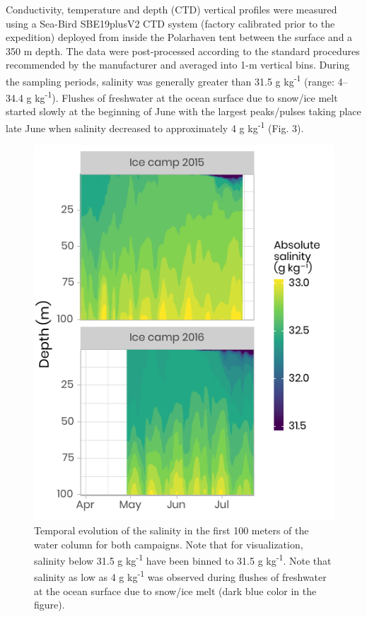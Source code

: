 \documentclass[essd, manuscript]{copernicus}
\begin{document}
Conductivity, temperature and depth (CTD) vertical profiles were measured using a Sea-Bird SBE19plusV2 CTD system (factory calibrated prior to the expedition) deployed from inside the Polarhaven tent between the surface and a 350 m depth. The data were post-processed according to the standard procedures recommended by the manufacturer and averaged into 1-m vertical bins. During the sampling periods, salinity was generally greater than 31.5 g kg\textsuperscript{-1} (range: 4--34.4 g kg\textsuperscript{-1}). Flushes of freshwater at the ocean surface due to snow/ice melt started slowly at the beginning of June with the largest peaks/pulses taking place late June when salinity decreased to approximately 4 g kg\textsuperscript{-1} (Fig. 3). 

\begin{figure}[H]
	\centering
	\includegraphics[scale = 1]{../../../graphs/fig03.pdf}
	\caption{Temporal evolution of the salinity in the first 100 meters of the water column for both campaigns. Note that for visualization, salinity below 31.5 g kg\textsuperscript{-1} have been binned to 31.5 g kg\textsuperscript{-1}. Note that salinity as low as 4 g kg\textsuperscript{-1} was observed during flushes of freshwater at the ocean surface due to snow/ice melt (dark blue color in the figure).}
\end{figure}
\end{document}
